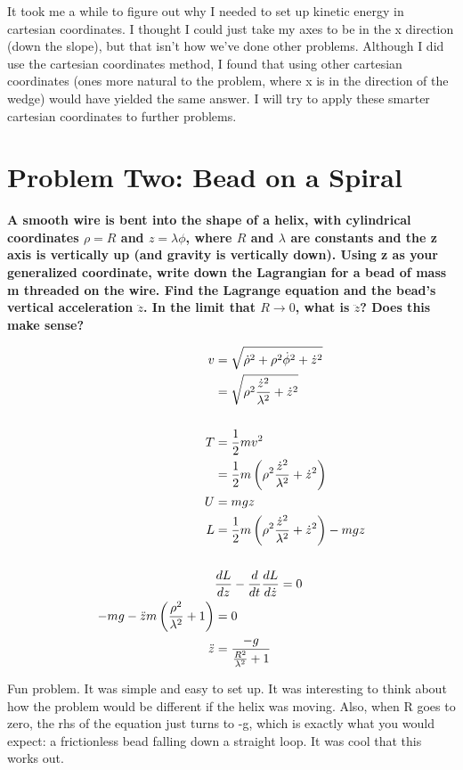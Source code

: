 \documentclass[10pt]{article} %
\begin{document}
It took me a while to figure out why I needed to set up kinetic energy in cartesian coordinates. I thought I could just take my axes to be in the x direction (down the slope), but that isn't how we've done other problems. Although I did use the cartesian coordinates method, I found that using other cartesian coordinates (ones more natural to the problem, where x is in the direction of the wedge) would have yielded the same answer. I will try to apply these smarter cartesian coordinates to further problems.\\

\section{Problem Two: Bead on a Spiral}
\textbf{A smooth wire is bent into the shape of a helix, with cylindrical coordinates $\rho=R$ and $z=\lambda\phi$, where $R$ and $\lambda$ are constants and the z axis is vertically up (and gravity is vertically down). Using z as your generalized coordinate, write down the Lagrangian for a bead of mass m threaded on the wire. Find the Lagrange equation and the bead’s vertical acceleration $\ddot{z}$. In the limit that $R → 0$, what is $\ddot{z}$? Does this make sense?}

\begin{align*}
  v &= \sqrt{\dot{\rho}^2 + \rho^2\dot{\phi}^2 + \dot{z}^2}\\
  &= \sqrt{\rho^2\frac{\dot{z}^2}{\lambda^2} + \dot{z}^2}\\
  \vspace{1cm}\\
  T &= \frac{1}{2}mv^2\\
  &= \frac{1}{2}m\left(\rho^2\frac{\dot{z}^2}{\lambda^2} + \dot{z}^2\right)\\
  U &= mgz\\
  L &= \frac{1}{2}m\left(\rho^2\frac{\dot{z}^2}{\lambda^2} + \dot{z}^2\right) - mgz\\
  \vspace{1cm}\\
  &\frac{dL}{dz} - \frac{d}{dt}\frac{dL}{d\dot{z}} = 0\\
  -mg - \ddot{z}m\left(\frac{\rho^2}{\lambda^2}+1\right) &= 0\\
  \ddot{z} &= \frac{-g}{\frac{R^2}{\lambda^2}+1}\\
\end{align*}

Fun problem. It was simple and easy to set up. It was interesting to think about how the problem would be different if the helix was moving. Also, when R goes to zero, the rhs of the equation just turns to -g, which is exactly what you would expect: a frictionless bead falling down a straight loop. It was cool that this works out.\\
\end{document}

